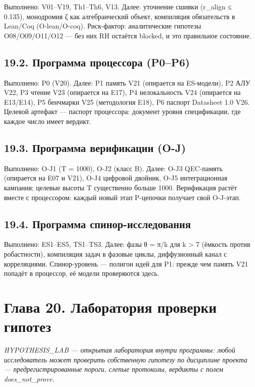 \documentclass[11pt,a4paper]{article}
\begin{document}
Выполнено: V01–V19, Th1–Th6, V13. Далее: уточнение сшивки (r\_align ≤ 0.135), монодромия ζ как алгебраический объект, компиляция обязательств в Lean/Coq (O-lean/O-coq). Риск-фактор: аналитические гипотезы O08/O09/O11/O12 — без них RH остаётся blocked, и это правильное состояние.

\subsection{19.2. Программа процессора (P0–P6)}

Выполнено: P0 (V20). Далее: P1 память V21 (опирается на ES-модели), P2 АЛУ V22, P3 чтение V23 (опирается на E17), P4 нелокальность V24 (опирается на E13/E14), P5 бенчмарки V25 (методология E18), P6 паспорт Datasheet 1.0 V26. Целевой артефакт — паспорт процессора: документ уровня спецификации, где каждое число имеет вердикт.

\subsection{19.3. Программа верификации (O-J)}

Выполнено: O-J1 (T = 1000), O-J2 (класс B). Далее: O-J3 QEC-память (опирается на E07 и V21), O-J4 цифровой двойник, O-J5 интеграционная кампания; целевые высоты T существенно больше 1000. Верификация растёт вместе с процессором: каждый новый этап P-цепочки получает свой O-J-этап.

\subsection{19.4. Программа спинор-исследования}

Выполнено: ES1–ES5, TS1–TS3. Далее: фазы θ = π/k для k > 7 (ёмкость против робастности), компиляция задач в фазовые циклы, диффузионный канал с корреляциями. Спинор-уровень — полигон идей для P1: прежде чем память V21 попадёт в процессор, её модели проверяются здесь.

\section{Глава 20. Лаборатория проверки гипотез}

\noindent\textit{\color{copper}HYPOTHESIS\_LAB — открытая лаборатория внутри программы: любой исследователь может проверить собственную гипотезу по дисциплине проекта — предрегистрированные пороги, слепые протоколы, вердикты с полем does\_not\_prove.}
\end{document}
